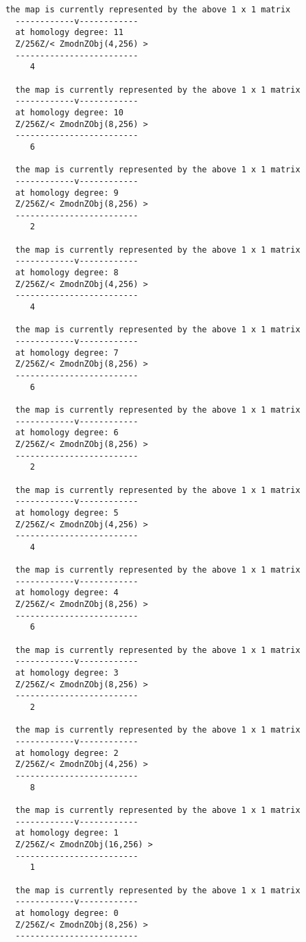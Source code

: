 \documentclass[a4paper,11pt]{report}
\begin{document}
{{\begin{Verbatim}[fontsize=\small,frame=single,label=Example]
  the map is currently represented by the above 1 x 1 matrix
  ------------v------------
  at homology degree: 11
  Z/256Z/< ZmodnZObj(4,256) > 
  -------------------------
     4
  
  the map is currently represented by the above 1 x 1 matrix
  ------------v------------
  at homology degree: 10
  Z/256Z/< ZmodnZObj(8,256) > 
  -------------------------
     6
  
  the map is currently represented by the above 1 x 1 matrix
  ------------v------------
  at homology degree: 9
  Z/256Z/< ZmodnZObj(8,256) > 
  -------------------------
     2
  
  the map is currently represented by the above 1 x 1 matrix
  ------------v------------
  at homology degree: 8
  Z/256Z/< ZmodnZObj(4,256) > 
  -------------------------
     4
  
  the map is currently represented by the above 1 x 1 matrix
  ------------v------------
  at homology degree: 7
  Z/256Z/< ZmodnZObj(8,256) > 
  -------------------------
     6
  
  the map is currently represented by the above 1 x 1 matrix
  ------------v------------
  at homology degree: 6
  Z/256Z/< ZmodnZObj(8,256) > 
  -------------------------
     2
  
  the map is currently represented by the above 1 x 1 matrix
  ------------v------------
  at homology degree: 5
  Z/256Z/< ZmodnZObj(4,256) > 
  -------------------------
     4
  
  the map is currently represented by the above 1 x 1 matrix
  ------------v------------
  at homology degree: 4
  Z/256Z/< ZmodnZObj(8,256) > 
  -------------------------
     6
  
  the map is currently represented by the above 1 x 1 matrix
  ------------v------------
  at homology degree: 3
  Z/256Z/< ZmodnZObj(8,256) > 
  -------------------------
     2
  
  the map is currently represented by the above 1 x 1 matrix
  ------------v------------
  at homology degree: 2
  Z/256Z/< ZmodnZObj(4,256) > 
  -------------------------
     8
  
  the map is currently represented by the above 1 x 1 matrix
  ------------v------------
  at homology degree: 1
  Z/256Z/< ZmodnZObj(16,256) > 
  -------------------------
     1
  
  the map is currently represented by the above 1 x 1 matrix
  ------------v------------
  at homology degree: 0
  Z/256Z/< ZmodnZObj(8,256) > 
  -------------------------
\end{Verbatim}
 }

  }
\end{document}
